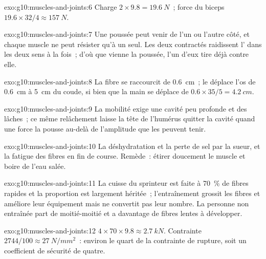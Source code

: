 \begin{solution}{exo:g10:muscles-and-joints:6}
Charge $2 \times 9.8 = \qty{19.6}{N}$~; force du biceps $19.6 \times 32/4
\approx \qty{157}{N}$.
\end{solution}

\begin{solution}{exo:g10:muscles-and-joints:7}
Une poussée peut venir de l'un ou l'autre côté, et chaque muscle ne
peut résister qu'à un seul. Les deux contractés raidissent
l' dans les deux sens à la fois~; d'où que vienne la
poussée, l'un d'eux tire déjà contre elle.
\end{solution}

\begin{solution}{exo:g10:muscles-and-joints:8}
La fibre se raccourcit de \qty{0.6}{cm}~; le  déplace l'os de
\qty{0.6}{cm} à \qty{5}{cm} du coude, si bien que la main se déplace de
$0.6 \times 35/5 = \qty{4.2}{cm}$.
\end{solution}

\begin{solution}{exo:g10:muscles-and-joints:9}
La mobilité exige une cavité peu profonde et des  lâches~; ce
même relâchement laisse la tête de l'humérus quitter la cavité quand une
force la pousse au-delà de l'amplitude que les  peuvent tenir.
\end{solution}

\begin{solution}{exo:g10:muscles-and-joints:10}
La déshydratation et la perte de sel par la sueur, et la fatigue des
fibres en fin de course. Remède~: étirer doucement le muscle et boire
de l'eau salée.
\end{solution}

\begin{solution}{exo:g10:muscles-and-joints:11}
La cuisse du sprinteur est faite à 70~\% de fibres rapides et la
proportion est largement héritée~; l'entraînement grossit les fibres et
améliore leur équipement mais ne convertit pas leur nombre. La personne
non entraînée part de moitié-moitié et a davantage de fibres lentes à
développer.
\end{solution}

\begin{solution}{exo:g10:muscles-and-joints:12}
$4 \times 70 \times 9.8 \approx \qty{2.7}{kN}$. Contrainte $2744/100
\approx \qty{27}{N/mm^2}$~: environ le quart de la contrainte de
rupture, soit un coefficient de sécurité de quatre.
\end{solution}

